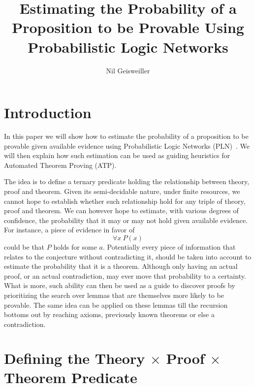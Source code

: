 \documentclass{easychair}
\title{Estimating the Probability of a Proposition to be Provable
  Using Probabilistic Logic Networks}
\author{Nil Geisweiller}
\institute{
  SingularityNET Foundation,\\
  Zug, Switzerland\\
  \email{nil@singularitynet.io}
}
\begin{document}
\maketitle

\begin{abstract}
\end{abstract}

\section{Introduction}

In this paper we will show how to estimate the probability of a
proposition to be provable given available evidence using
Probabilistic Logic Networks (PLN)~\cite{Goertzel09PLN}.  We will then
explain how such estimation can be used as guiding heuristics for
Automated Theorem Proving (ATP).

The idea is to define a ternary predicate holding the relationship
between theory, proof and theorem.  Given its semi-decidable nature,
under finite resources, we cannot hope to establish whether such
relationship hold for any triple of theory, proof and theorem.  We can
however hope to estimate, with various degrees of confidence, the
probability that it may or may not hold given available evidence.  For
instance, a piece of evidence in favor of
$$\forall x \ P(x)$$ could be that $P$ holds for some $a$.
Potentially every piece of information that relates to the conjecture
without contradicting it, should be taken into account to estimate the
probability that it is a theorem.  Although only having an actual
proof, or an actual contradiction, may ever move that probability to a
certainty.  What is more, such ability can then be used as a guide to
discover proofs by prioritizing the search over lemmas that are
themselves more likely to be provable.  The same idea can be applied
on these lemmas till the recursion bottoms out by reaching axioms,
previously known theorems or else a contradiction.

\section{Defining the Theory $\times$ Proof $\times$ Theorem Predicate}

\newpage



\label{sect:bib}
%
%
%


\newpage


\appendix

\end{document}
